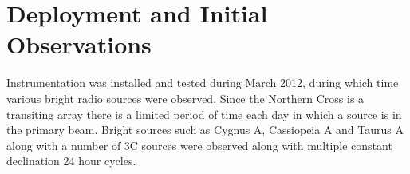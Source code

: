 \documentclass[useAMS,macros,usenatbib]{mn2e}
\begin{document}
%

\section{Deployment and Initial Observations}
\label{observations}

Instrumentation was installed and tested during March 2012, during which time various bright radio sources were observed.
Since the Northern Cross is a transiting array there is a limited period of time each day in which a source is in the primary beam.
Bright sources such as Cygnus A, Cassiopeia A and Taurus A along with a number of 3C sources were observed along with multiple constant declination 24 hour cycles.
\end{document}
